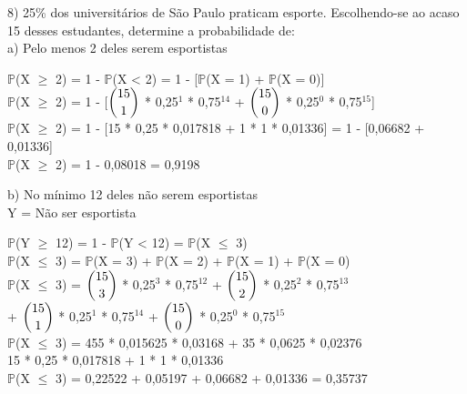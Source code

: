 \documentclass[12pt,a4paper]{article}
\begin{document}
	\vspace{1cm}
	8) 25\% dos universitários de São Paulo praticam esporte. Escolhendo-se ao acaso 15 desses estudantes, determine a probabilidade de:\\
	a) Pelo menos 2 deles serem esportistas
	\begin{center}
		\vspace{0.5cm}
		$\mathbb{P}$(X $\geq$ 2) = 1 - $\mathbb{P}$(X < 2) = 1 - [$\mathbb{P}$(X = 1) + $\mathbb{P}$(X = 0)]
		\vspace{0.25cm}\\
		$\mathbb{P}$(X $\geq$ 2) = 1 - [$\dbinom{15}{1}$ * 0,25$^1$ * 0,75$^{14}$ + $\dbinom{15}{0}$ * 0,25$^0$ * 0,75$^{15}$]	
		\vspace{0.25cm}\\
		$\mathbb{P}$(X $\geq$ 2) = 1 - [15 * 0,25 * 0,017818 + 1 * 1 * 0,01336] = 1 - [0,06682 + 0,01336]
		\vspace{0.25cm}\\
		$\mathbb{P}$(X $\geq$ 2) =	1 - 0,08018 = 0,9198
	\end{center}
	\vspace{1cm}
	b) No mínimo 12 deles não serem esportistas
	\vspace{0.5cm}\\
	Y = Não ser esportista
	\begin{center}
		\vspace{0.5cm}
		$\mathbb{P}$(Y $\geq$ 12) = 1 - $\mathbb{P}$(Y < 12) = $\mathbb{P}$(X $\leq$ 3)
		\vspace{0.75cm}\\
		$\mathbb{P}$(X $\leq$ 3) = $\mathbb{P}$(X = 3) + $\mathbb{P}$(X = 2) + $\mathbb{P}$(X = 1) + $\mathbb{P}$(X = 0)
		\vspace{0.25cm}\\
		$\mathbb{P}$(X $\leq$ 3) = $\dbinom{15}{3}$ * 0,25$^3$ * 0,75$^{12}$ + $\dbinom{15}{2}$ * 0,25$^2$ * 0,75$^{13}$\\ + $\dbinom{15}{1}$ * 0,25$^1$ * 0,75$^{14}$ + $\dbinom{15}{0}$ * 0,25$^0$ * 0,75$^{15}$
		\vspace{0.25cm}\\
		$\mathbb{P}$(X $\leq$ 3) = 455 * 0,015625 * 0,03168 + 35 * 0,0625 * 0,02376\\ 15 * 0,25 * 0,017818 + 1 * 1 * 0,01336
		\vspace{0.25cm}\\
		$\mathbb{P}$(X $\leq$ 3) = 0,22522 + 0,05197 + 0,06682 + 0,01336 = 0,35737
	\end{center}
\end{document}
